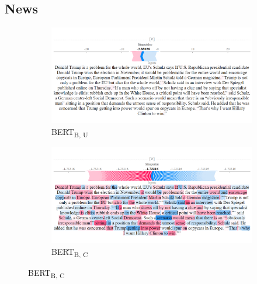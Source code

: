 \clearpage
\subsection{News}
\label{fig:shap-news-annex}

\begin{figure}[!h]
    \captionsetup[subfigure]{justification=Centering}
    \begin{subfigure}[t]{0.35\textwidth}
        \includegraphics[width=\textwidth]{figs/news_T/bert-b-u.png}
        \caption{{BERT}\textsubscript{B, U}}
    \end{subfigure}
    \hspace{\fill} %
    \begin{subfigure}[t]{0.35\textwidth}
        \includegraphics[width=\linewidth]{figs/news_T/bert-b-c.png}
        \caption{{BERT}\textsubscript{B, C}}
    \end{subfigure}




\end{figure}
